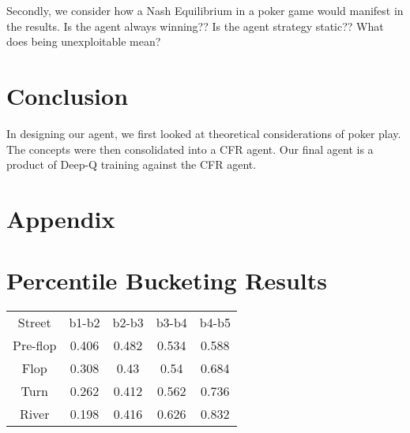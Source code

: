 \documentclass{article}
\begin{document}
Secondly, we consider how a Nash Equilibrium in a poker game would manifest in the results. Is the agent always winning?? Is the agent strategy static?? What does being unexploitable mean?

\section{Conclusion}

In designing our agent, we first looked at theoretical considerations of poker play. The concepts were then consolidated into a CFR agent. Our final agent is a product of Deep-Q training against the CFR agent.



\iffalse
@article{ todd:cfr,
  author = "Todd W. Neller and Marc Lanctot"
  title = "An Introduction to Counterfactual Regret Minimization",
  month = "July",
  year = "2013"
}


@article{ yako:dqn,
	author = "Nikolai Yakovenko, Liangliang Cao, Colin Raffel and James Fan",
	title = "Poker-CNN: A Pattern Learning Strategy for Making Draws and Bets in Poker Games",
	journal = "Association for the Advancement of Artificial
Intelligence",
	month = "September",
	year = 2015
}

@article{ samz:tartarian,
	author = "Sam Ganzfried and Tuomas Sandholm",
	title = "Tartanian5: A Heads-Up No-Limit Texas Hold’em Poker-Playing Program",
	journal = "Association for the Advancement of Artificial
Intelligence",
	year = "2012"
}

@article{ michael:guide,
	author = "Michael Bradley Johanson",
	title = "Robust Strategies and Counter-Strategies: Building a Champion Level Computer Poker Player",
	journal = "University of Alberta Library"
	year = "2007"
}
\fi
\appendix
\section{Appendix}

\section{Percentile Bucketing Results}
\begin{center}
\begin{tabular}{ c c c c c }
Street & b1-b2 & b2-b3 & b3-b4 & b4-b5\\
Pre-flop & 0.406 & 0.482 & 0.534 & 0.588\\ 
Flop & 0.308 & 0.43 & 0.54 & 0.684\\
Turn & 0.262 & 0.412 & 0.562 & 0.736\\
River & 0.198 & 0.416 & 0.626 & 0.832
\end{tabular}
\end{center}
\end{document}
